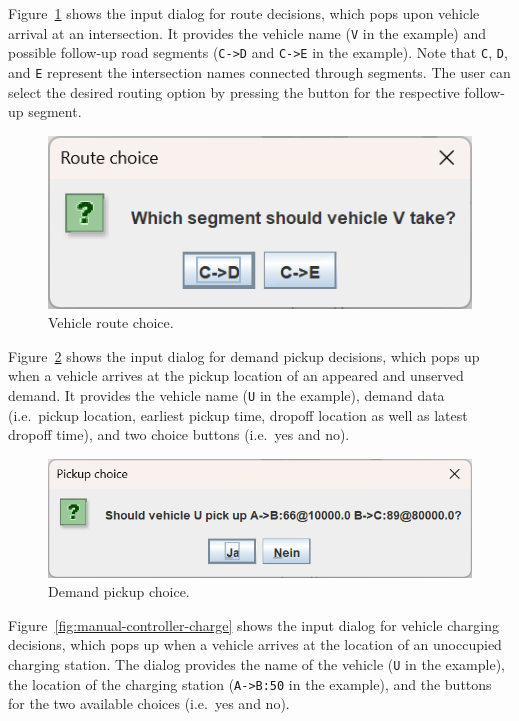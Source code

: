\documentclass[a4paper,twoside]{article}
\begin{document}
	Figure~\ref{fig:manual-controller-route} shows the input dialog for route decisions, which pops upon vehicle arrival at an intersection.
	It provides the vehicle name (\texttt{V} in the example) and possible follow-up road segments (\texttt{C->D} and \texttt{C->E} in the example).
	Note that \texttt{C}, \texttt{D}, and \texttt{E} represent the intersection names connected through segments.
	The user can select the desired routing option by pressing the button for the respective follow-up segment.
	
	\begin{figure}[!ht]
		\centering
		\includegraphics[scale=0.3]{./graphics/screenshots/manual-controller-route.png}
		\caption{Vehicle route choice.}
		\label{fig:manual-controller-route}
	\end{figure}
	
	Figure~\ref{fig:manual-controller-demand} shows the input dialog for demand pickup decisions, which pops up when a vehicle arrives at the pickup location of an appeared and unserved demand.
	It provides the vehicle name (\texttt{U} in the example), demand data (i.e.\ pickup location, earliest pickup time, dropoff location as well as latest dropoff time), and two choice buttons (i.e.\ yes and no).
	
	\begin{figure}[!ht]
		\centering
		\includegraphics[scale=0.3]{./graphics/screenshots/manual-controller-demand.png}
		\caption{Demand pickup choice.}
		\label{fig:manual-controller-demand}
	\end{figure}
	
	Figure~\ref{fig:manual-controller-charge} shows the input dialog for vehicle charging decisions, which pops up when a vehicle arrives at the location of an unoccupied charging station.
	The dialog provides the name of the vehicle (\texttt{U} in the example), the location of the charging station (\texttt{A->B:50} in the example), and the buttons for the two available choices (i.e.\ yes and no).
\end{document}
